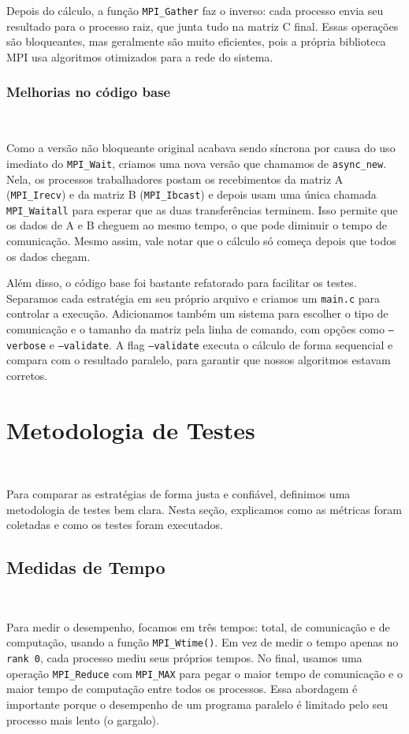 \documentclass{article}
\begin{document}
Depois do cálculo, a função \texttt{MPI\_Gather} faz o inverso: cada processo envia seu resultado para o processo raiz, que junta tudo na matriz C final. Essas operações são bloqueantes, mas geralmente são muito eficientes, pois a própria biblioteca MPI usa algoritmos otimizados para a rede do sistema.

\subsubsection{Melhorias no código base}
\

Como a versão não bloqueante original acabava sendo síncrona por causa do uso imediato do \texttt{MPI\_Wait}, criamos uma nova versão que chamamos de \texttt{async\_new}. Nela, os processos trabalhadores postam os recebimentos da matriz A (\texttt{MPI\_Irecv}) e da matriz B (\texttt{MPI\_Ibcast}) e depois usam uma única chamada \texttt{MPI\_Waitall} para esperar que as duas transferências terminem. Isso permite que os dados de A e B cheguem ao mesmo tempo, o que pode diminuir o tempo de comunicação. Mesmo assim, vale notar que o cálculo só começa depois que todos os dados chegam.

Além disso, o código base foi bastante refatorado para facilitar os testes. Separamos cada estratégia em seu próprio arquivo e criamos um \texttt{main.c} para controlar a execução. Adicionamos também um sistema para escolher o tipo de comunicação e o tamanho da matriz pela linha de comando, com opções como \texttt{--verbose} e \texttt{--validate}. A flag \texttt{--validate} executa o cálculo de forma sequencial e compara com o resultado paralelo, para garantir que nossos algoritmos estavam corretos.

\section{Metodologia de Testes}
\

Para comparar as estratégias de forma justa e confiável, definimos uma metodologia de testes bem clara. Nesta seção, explicamos como as métricas foram coletadas e como os testes foram executados.

\subsection{Medidas de Tempo}
\

Para medir o desempenho, focamos em três tempos: total, de comunicação e de computação, usando a função \texttt{MPI\_Wtime()}. Em vez de medir o tempo apenas no \texttt{rank 0}, cada processo mediu seus próprios tempos. No final, usamos uma operação \texttt{MPI\_Reduce} com \texttt{MPI\_MAX} para pegar o maior tempo de comunicação e o maior tempo de computação entre todos os processos. Essa abordagem é importante porque o desempenho de um programa paralelo é limitado pelo seu processo mais lento (o gargalo).
\end{document}

